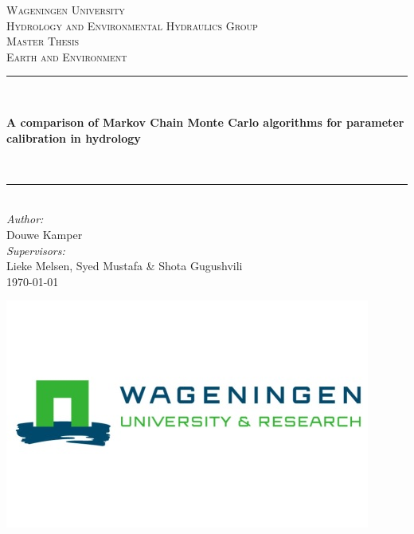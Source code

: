 \documentclass[iicol,pdflatex,sn-mathphys-ay]{sn-jnl}%
\begin{document}
\begin{titlepage}
    \thispagestyle{empty}
    \begin{center}
        \vspace*{2cm} %
        {\huge \textsc{Wageningen University}}\\
        \vspace{1cm}%
        {\Large \textsc{Hydrology and Environmental Hydraulics Group}}\\
        \vspace{1cm} %
        {\large \textsc{Master Thesis}}\\
        \vspace{5mm}
        {\large \textsc{Earth and Environment}}\\
        \vspace*{2cm}
        \rule{.8\linewidth}{.6pt}\\[0.6cm]
        \begin{minipage}{0.8\linewidth}
            \centering
            {\Huge \bfseries A comparison of Markov Chain Monte Carlo algorithms for parameter calibration in hydrology}
        \end{minipage}\\[0.4cm]
        \rule{.8\linewidth}{.6pt}\\[2cm]%
        \textit{Author:}\\
        Douwe Kamper\\
        \vspace*{0.5cm}
        \textit{Supervisors:}\\
        Lieke Melsen, Syed Mustafa \& Shota Gugushvili\\
        \vspace{0.5cm} 
        \today %
    \end{center}
    \vspace*{1cm} %
    \begin{center}
        \includegraphics[scale=0.45]{Figures/logo.jpg}
    \end{center}
\end{titlepage}
\newpage
\end{document}
